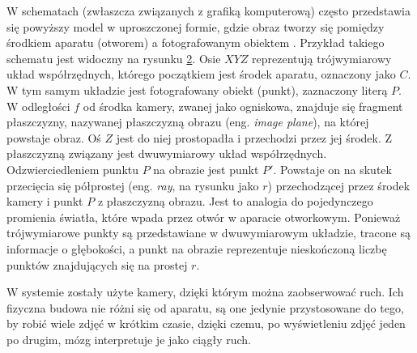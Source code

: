 \begin{figure}[h!]
\begin{center}

\end{center}
\label{camera_obscura}
\end{figure} 

W schematach (zwłaszcza związanych z grafiką komputerową) często przedstawia się powyższy model w uproszczonej formie, gdzie obraz tworzy się pomiędzy środkiem aparatu (otworem) a fotografowanym obiektem \cite{Pinhole_MSc}. Przykład takiego schematu jest widoczny na rysunku \ref{pinhole_model}. Osie $XYZ$ reprezentują trójwymiarowy układ współrzędnych, którego początkiem jest środek aparatu, oznaczony jako $C$. W tym samym układzie jest fotografowany obiekt (punkt), zaznaczony literą $P$. W odległości $f$ od środka kamery, zwanej jako ogniskowa, znajduje się fragment płaszczyzny, nazywanej płaszczyzną obrazu (eng. \textit{image plane}), na której powstaje obraz. Oś $Z$ jest do niej prostopadła i przechodzi przez jej środek. Z płaszczyzną związany jest dwuwymiarowy układ współrzędnych. Odzwierciedleniem punktu $P$ na obrazie jest punkt $P'$. Powstaje on na skutek przecięcia się półprostej (eng. \textit{ray}, na rysunku jako $r$) przechodzącej przez środek kamery i punkt $P$ z płaszczyzną obrazu. Jest to analogia do pojedynczego promienia światła, które wpada przez otwór w aparacie otworkowym. Ponieważ trójwymiarowe punkty są przedstawiane w dwuwymiarowym układzie, tracone są informacje o głębokości, a punkt na obrazie reprezentuje nieskończoną liczbę punktów znajdujących się na prostej $r$.

\begin{figure}[h!]
\begin{center}

\end{center}
\label{pinhole_model}
\end{figure} 

W systemie zostały użyte kamery, dzięki którym można zaobserwować ruch. Ich fizyczna budowa nie różni się od aparatu, są one jedynie przystosowane do tego, by robić wiele zdjęć w krótkim czasie, dzięki czemu, po wyświetleniu zdjęć jeden po drugim, mózg interpretuje je jako ciągły ruch.

